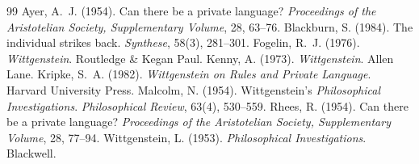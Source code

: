 \documentclass{situationist-preprint}
\begin{document}
\begin{thebibliography}{99}\small
{} Ayer, A.~J. (1954). Can there be a private language? \emph{Proceedings of the Aristotelian Society, Supplementary Volume}, 28, 63--76.
 Blackburn, S. (1984). The individual strikes back. \emph{Synthese}, 58(3), 281--301.
 Fogelin, R.~J. (1976). \emph{Wittgenstein}. Routledge \& Kegan Paul.
 Kenny, A. (1973). \emph{Wittgenstein}. Allen Lane.
 Kripke, S.~A. (1982). \emph{Wittgenstein on Rules and Private Language}. Harvard University Press.
 Malcolm, N. (1954). Wittgenstein's \emph{Philosophical Investigations}. \emph{Philosophical Review}, 63(4), 530--559.
 Rhees, R. (1954). Can there be a private language? \emph{Proceedings of the Aristotelian Society, Supplementary Volume}, 28, 77--94.
 Wittgenstein, L. (1953). \emph{Philosophical Investigations}. Blackwell.
\end{thebibliography}
\end{document}
